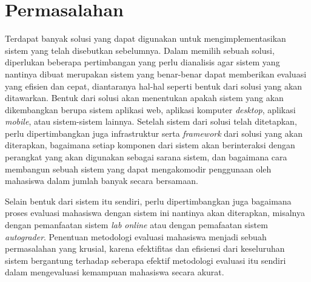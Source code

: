 
\section{Permasalahan}
\label{sec:masalah}
Terdapat banyak solusi yang dapat digunakan untuk mengimplementasikan sistem yang telah disebutkan sebelumnya. Dalam memilih sebuah solusi, diperlukan beberapa pertimbangan yang perlu dianalisis
agar sistem yang nantinya dibuat merupakan sistem yang benar-benar dapat memberikan evaluasi yang efisien dan cepat, diantaranya hal-hal seperti bentuk dari solusi yang akan ditawarkan. Bentuk dari
solusi akan menentukan apakah sistem yang akan dikembangkan berupa sistem aplikasi web, aplikasi komputer \textit{desktop}, aplikasi \textit{mobile}, atau sistem-sistem lainnya. 
Setelah sistem dari solusi telah ditetapkan, perlu dipertimbangkan juga infrastruktur serta \textit{framework} dari solusi yang akan diterapkan, bagaimana setiap komponen dari sistem akan berinteraksi
dengan perangkat yang akan digunakan sebagai sarana sistem, dan bagaimana cara membangun sebuah sistem yang dapat mengakomodir penggunaan oleh mahasiswa dalam jumlah banyak secara bersamaan. 
\par

Selain bentuk dari sistem itu sendiri, perlu dipertimbangkan juga bagaimana proses evaluasi mahasiswa dengan sistem ini nantinya akan diterapkan, misalnya dengan pemanfaatan sistem \textit{lab online} 
atau dengan pemafaatan sistem \textit{autograder}. Penentuan metodologi evaluasi mahasiswa menjadi sebuah permasalahan yang krusial, karena efektifitas dan efisiensi dari keseluruhan sistem bergantung 
terhadap seberapa efektif metodologi evaluasi itu sendiri dalam mengevaluasi kemampuan mahasiswa secara akurat. 
\par

